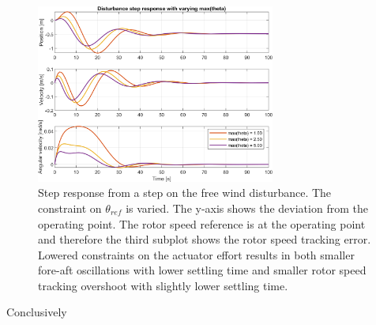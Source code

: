 \begin{figure}[ht]
	\centering
	\includegraphics[width=0.7\textwidth]{Graphics/LQI pole zero/105_step_theta.png}
	\caption{Step response from a step on the free wind disturbance. The constraint on $ \theta_{ref} $ is varied. The y-axis shows the deviation from the operating point. The rotor speed reference is at the operating point and therefore the third subplot shows the rotor speed tracking error. Lowered constraints on the actuator effort results in both smaller fore-aft oscillations with lower settling time and smaller rotor speed tracking overshoot with slightly lower settling time.}
	\label{fig:step_theta}
\end{figure}
Conclusively 

%	
%	
